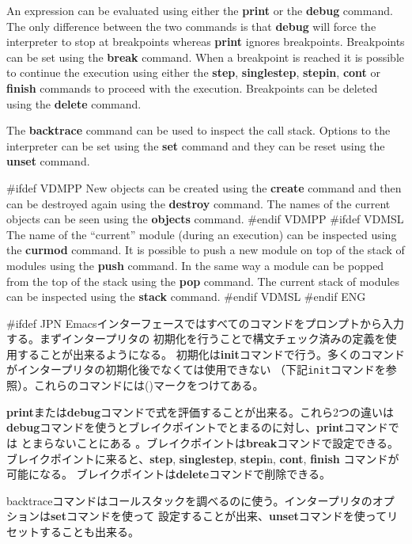\documentclass[\pformat,12pt]{article}
\newcommand{\cmd}{\tt }
\begin{document}
An expression can be evaluated using
either the \textbf{print} or the \textbf{debug} command.  The only
difference between the two commands is that {\bf debug} will force
the interpreter to stop at breakpoints whereas {\bf print} ignores
breakpoints. Breakpoints can be set using
the \textbf{break} command. When a breakpoint is reached it is
possible to continue the execution using either the \textbf{step},
\textbf{singlestep}, \textbf{stepin}, \textbf{cont} or \textbf{finish}
commands to
proceed with the execution. Breakpoints can be deleted using the
\textbf{delete} command.

The \textbf{backtrace} command can be used to inspect the call stack.
Options to the interpreter can be set using the \textbf{set} command
and they can be reset using the \textbf{unset} command.

#ifdef VDMPP
New objects can be created using the \textbf{create} command and then
can be destroyed again using the \textbf{destroy} command. The names
of the current objects can be seen using the \textbf{objects} command.
#endif VDMPP
#ifdef VDMSL
The name of the ``current'' module (during an execution) can be
inspected using the \textbf{curmod} command. It is possible to push a
new module on top of the stack of modules using the \textbf{push}
command. In the same way a module can be popped from the top of the
stack using the \textbf{pop} command. The current stack of modules can
be inspected using the \textbf{stack} command.
#endif VDMSL
#endif ENG

#ifdef JPN
Emacsインターフェースではすべてのコマンドをプロンプトから入力する。まずインタープリタの
初期化を行うことで構文チェック済みの定義を使用することが出来るようになる。
初期化は\textbf{init}コマンドで行う。多くのコマンドがインタープリタの初期化後でなくては使用できない
（下記{\cmd init}コマンドを参照）。これらのコマンドには({\tt *})マークをつけてある。

\textbf{print}または\textbf{debug}コマンドで式を評価することが出来る。これら2つの違いは
{\bf debug}コマンドを使うとブレイクポイントでとまるのに対し、{\bf print}コマンドでは
とまらないことにある 。ブレイクポイントは\textbf{break}コマンドで設定できる。
ブレイクポイントに来ると、\textbf{step}, \textbf{singlestep}, \textbf{stepi}n, \textbf{cont}, \textbf{finish} 
コマンドが可能になる。
ブレイクポイントは\textbf{delete}コマンドで削除できる。

backtraceコマンドはコールスタックを調べるのに使う。インタープリタのオプションは\textbf{set}コマンドを使って
設定することが出来、\textbf{unset}コマンドを使ってリセットすることも出来る。
\end{document}
